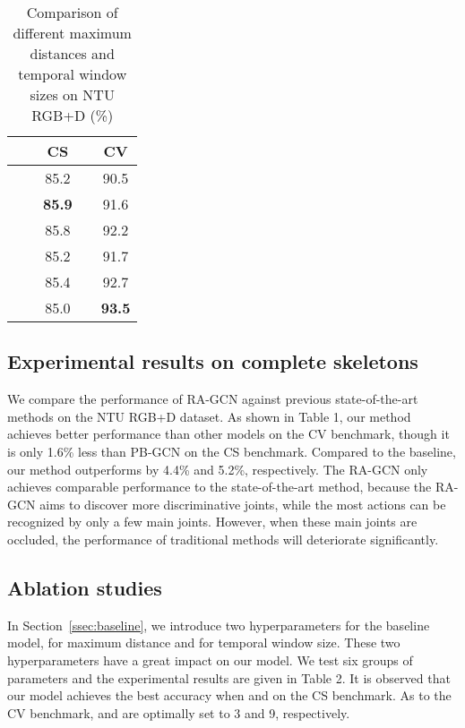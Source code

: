 \documentclass{article}
\begin{document}
\begin{table}
\label{tab:2}
\caption{Comparison of different maximum distances and temporal window sizes on NTU RGB+D (\%)}
\centering
\begin{tabular}{ccccc}
\hline
& & CS &  & CV \\
\hline
&  & 85.2 & &  90.5 \\
&  & {\bf 85.9} & & 91.6 \\
&  & 85.8 & & 92.2 \\
&  & 85.2 & & 91.7 \\
&  & 85.4 & & 92.7 \\
&  & 85.0 & & {\bf 93.5} \\
\hline
\end{tabular}
\end{table}

\subsection{Experimental results on complete skeletons}
\label{ssec:results}

We compare the performance of RA-GCN against previous state-of-the-art methods on the NTU RGB+D dataset. As shown in Table 1, our method achieves better performance than other models on the CV benchmark, though it is only 1.6\% less than PB-GCN \cite{Thakkar2018} on the CS benchmark. Compared to the baseline, our method outperforms by 4.4\% and 5.2\%, respectively. The RA-GCN only achieves comparable performance to the state-of-the-art method, because the RA-GCN aims to discover more discriminative joints, while the most actions can be recognized by only a few main joints. However, when these main joints are occluded, the performance of traditional methods will deteriorate significantly.

\subsection{Ablation studies}
\label{ssec:ablation}

In Section~\ref{ssec:baseline}, we introduce two hyperparameters for the baseline model,  for maximum distance and  for temporal window size. These two hyperparameters have a great impact on our model. We test six groups of parameters and the experimental results are given in Table 2. It is observed that our model achieves the best accuracy when  and  on the CS benchmark. As to the CV benchmark,  and  are optimally set to 3 and 9, respectively.
\end{document}
